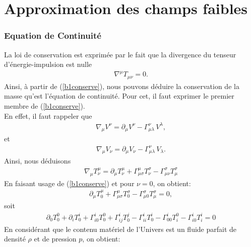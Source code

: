\documentclass[a4paper,12pt]{report}
\theoremstyle{plain}
\theoremstyle{plain}
\begin{document}

\part{Approximation des champs faibles}
\section{Equation de Continuit\'e}
La loi de conservation est exprim\'ee par le fait que la divergence du tenseur
d'\'energie-impulsion est nulle
 \begin{eqnarray}\label{b1conserve}
 \nabla^{\mu} T_{\mu\nu}=0.
\end{eqnarray}
Ainsi, \`a partir de (\ref{b1conserve}), nous pouvons d\'eduire la conservation de la masse qu'est l'\'equation de
continuit\'e. Pour cet, il faut exprimer le premier membre de (\ref{b1conserve}). \\
En effet, il faut rappeler que 
\begin{eqnarray}
 \nabla_{\mu} V^\nu = \partial_\mu V^\nu -\Gamma^\nu_{\mu\lambda}\, V^\lambda,
\end{eqnarray}
et
\begin{eqnarray}
 \nabla_{\mu} V_\nu = \partial_\mu V_\nu -\Gamma^\nu_{\mu\lambda}\, V_\lambda.
\end{eqnarray}
Ainsi,  nous d\'eduisons
\begin{eqnarray}
 \nabla_{\mu} T^\mu_\nu = \partial_\mu T^\mu_\nu  + \Gamma^\mu_{\mu\sigma}
 T^\sigma_\nu -  \Gamma^\sigma_{\mu\nu} T^\sigma_\mu
\end{eqnarray}
En faisant usage de (\ref{b1conserve}) et  pour $\nu=0$, on obtient:
\begin{eqnarray}
  \partial_\mu T^\mu_0  + \Gamma^\mu_{\mu\sigma}
 T^\sigma_0 -  \Gamma^\sigma_{\mu0} T^\sigma_\mu=0,
\end{eqnarray}
soit 
\begin{eqnarray}
  \partial_0 T^0_0  +\partial_i T^i_0+ \Gamma^i_{i0}
 T^0_0 +   \Gamma^i_{ij} T^j_0- \Gamma^i_{ii} T^i_0-\Gamma^i_{00} T^0_i -\Gamma^i_{i0} T^i_i=0
\end{eqnarray}
En consid\'erant que le contenu mat\'eriel de l'Univers est un fluide parfait de densit\'e 
$\rho$ et de pression $p$, on obtient:
\end{document}
